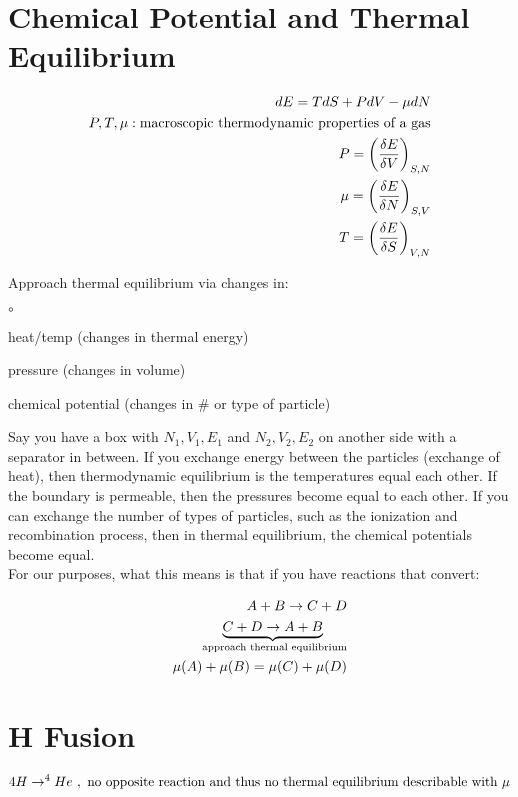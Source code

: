 \section{Chemical Potential and Thermal Equilibrium}

\begin{align}
dE = TdS + PdV - \mu dN\\
P,T,\mu: \text{macroscopic thermodynamic properties of a gas}\\
P = \left( \frac{\delta E}{\delta V} \right)_{S,N}\\
\mu = \left( \frac{\delta E}{\delta N} \right)_{S,V}\\
T = \left( \frac{\delta E}{\delta S} \right)_{V,N}
\end{align}

Approach thermal equilibrium via changes in:

\begin{list}{$\circ$}{}
\item heat/temp (changes in thermal energy)
\item pressure (changes in volume)
\item chemical potential (changes in \# or type of particle)
\end{list}

Say you have a box with $N_1,V_1,E_1$ and $N_2,V_2,E_2$ on another side with a separator in between. If you exchange energy between the particles (exchange of heat), then thermodynamic equilibrium is the temperatures equal each other. If the boundary is permeable, then the pressures become equal to each other. If you can exchange the number of types of particles, such as the ionization and recombination process, then in thermal equilibrium, the chemical potentials become equal. \\

For our purposes, what this means is that if you have reactions that convert:

\begin{align}
A + B \rightarrow C + D\\
\underbrace{C + D \rightarrow A + B}_{\text{ approach thermal equilibrium}}\\
\mu(A) + \mu(B) = \mu(C) + \mu(D)
\end{align}

\section{H Fusion}

\begin{align}
4 H \rightarrow ^4He~,\text{ no opposite reaction and thus no thermal equilibrium describable with $\mu$}
\end{align}

